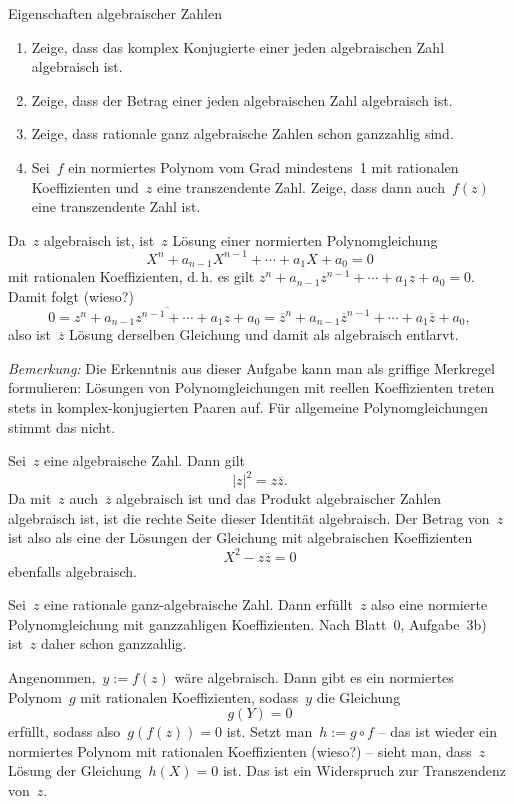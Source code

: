 \documentclass{algblatt}
\begin{document}
\ifloesungen\newpage\fi
\begin{aufgabe}{Eigenschaften algebraischer Zahlen}
\begin{enumerate}
\item Zeige, dass das komplex Konjugierte einer jeden algebraischen Zahl algebraisch
ist.
\item Zeige, dass der Betrag einer jeden algebraischen Zahl algebraisch ist.
\item Zeige, dass rationale ganz algebraische Zahlen schon ganzzahlig sind.
\item Sei~$f$ ein normiertes Polynom vom Grad mindestens~1 mit rationalen Koeffizienten
und~$z$ eine transzendente Zahl. Zeige, dass dann auch~$f(z)$ eine
transzendente Zahl ist.
\end{enumerate}
\begin{loesungE}
\item Da~$z$ algebraisch ist, ist~$z$ Lösung einer normierten Polynomgleichung
\[ X^n + a_{n-1} X^{n-1} + \cdots + a_1 X + a_0 = 0 \]
mit rationalen Koeffizienten, d.\,h. es gilt
$z^n + a_{n-1} z^{n-1} + \cdots + a_1 z + a_0 = 0$.
Damit folgt (wieso?)
\[ 0 = \overline{z^n + a_{n-1} z^{n-1} + \cdots + a_1 z + a_0} =
  \overline{z}^n + a_{n-1} \overline{z}^{n-1} + \cdots + a_1 \overline{z} + a_0, \]
also ist~$\overline{z}$ Lösung derselben Gleichung und damit als algebraisch
entlarvt.

\emph{Bemerkung:} Die Erkenntnis aus dieser Aufgabe kann man als griffige
Merkregel formulieren: Lösungen von Polynomgleichungen mit reellen
Koeffizienten treten stets in komplex-konjugierten Paaren auf. Für allgemeine
Polynomgleichungen stimmt das nicht.

\item Sei~$z$ eine algebraische Zahl. Dann gilt
\[ |z|^2 = z \overline{z}. \]
Da mit~$z$ auch~$\overline{z}$ algebraisch ist und das Produkt algebraischer
Zahlen algebraisch ist, ist die rechte Seite dieser Identität algebraisch. Der
Betrag von~$z$ ist also als eine der Lösungen der Gleichung mit algebraischen
Koeffizienten
\[ X^2 - z \overline{z} = 0 \]
ebenfalls algebraisch.
\item Sei~$z$ eine rationale ganz-algebraische Zahl. Dann erfüllt~$z$ also eine
normierte Polynomgleichung mit ganzzahligen Koeffizienten. Nach Blatt~0,
Aufgabe~3b) ist~$z$ daher schon ganzzahlig.
\item Angenommen,~$y := f(z)$ wäre algebraisch. Dann gibt es ein normiertes
Polynom~$g$ mit rationalen Koeffizienten, sodass~$y$ die Gleichung
\[ g(Y) = 0 \]
erfüllt, sodass also~$g(f(z)) = 0$ ist. Setzt man~$h := g \circ f$ -- das ist
wieder ein normiertes Polynom mit rationalen Koeffizienten (wieso?) -- sieht
man, dass~$z$ Lösung der Gleichung~$h(X) = 0$ ist. Das ist ein Widerspruch zur
Transzendenz von~$z$.


\end{loesungE}
\end{aufgabe}
\end{document}
